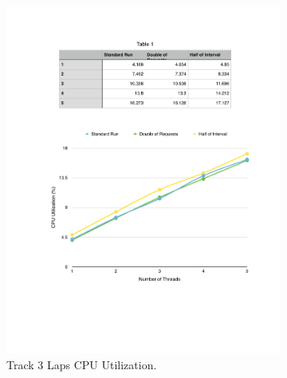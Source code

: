 \begin{figure}[ht!]
\centering
\begin{subfigure}{.5\textwidth}
  \centering
  \includegraphics[width=\linewidth]{./images/cpu_3_lap}
  \caption{Track 3 Laps CPU Utilization.}
  \label{fig:eval_3laps_cpu}
\end{subfigure}%
\begin{subfigure}{.5\textwidth}
  \centering

\end{subfigure}
\end{figure}
